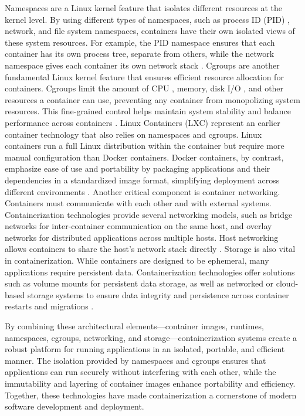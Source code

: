 Namespaces are a Linux kernel feature that isolates different resources at the kernel
level. By using different types of namespaces, such as process ID (PID) \cite
{ProcessIdentifier2024}, network, and file system namespaces, containers have their
own isolated views of these system resources. For example, the PID namespace ensures
that each container has its own process tree, separate from others, while the network
namespace gives each container its own network stack \cite{LinuxNamespaces2024}.
Cgroups are another fundamental Linux kernel feature that ensures efficient resource
allocation for containers. Cgroups limit the amount of CPU \cite{CentralProcessingUnit2024},
memory, disk I/O \cite{InputOutput2024}, and other resources a container can use,
preventing any container from monopolizing system resources. This fine-grained control
helps maintain system stability and balance performance across containers
\cite{Cgroups2024}.
Linux Containers (LXC) represent an earlier container technology that also relies on
namespaces and cgroups. Linux containers run a full Linux distribution within the
container but require more manual configuration than Docker containers. Docker
containers, by contrast, emphasize ease of use and portability by packaging
applications and their dependencies in a standardized image format, simplifying
deployment across different environments \cite{LinuxContainers}.
Another critical component is container networking. Containers must communicate with
each other and with external systems. Containerization technologies provide several
networking models, such as bridge networks for inter-container communication on the
same host, and overlay networks for distributed applications across multiple hosts.
Host networking allows containers to share the host’s network stack directly
\cite{Networking0200}.
Storage is also vital in containerization. While containers are designed to be ephemeral,
many applications require persistent data. Containerization technologies offer solutions
such as volume mounts for persistent data storage, as well as networked or cloud-based
storage systems to ensure data integrity and persistence across container restarts and
migrations \cite{PersistingContainerData0200}.

By combining these architectural elements—container images, runtimes, namespaces,
cgroups, networking, and storage—containerization systems create a robust platform for
running applications in an isolated, portable, and efficient manner. The isolation
provided by namespaces and cgroups ensures that applications can run securely without
interfering with each other, while the immutability and layering of container images
enhance portability and efficiency. Together, these technologies have made
containerization a cornerstone of modern software development and deployment.

